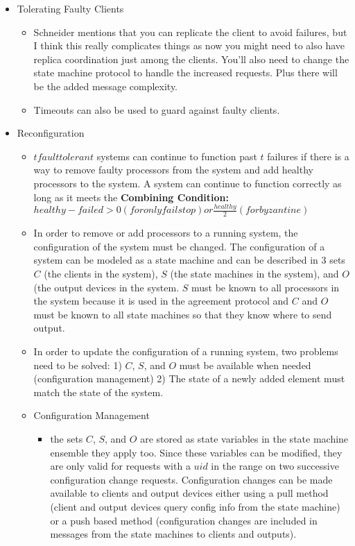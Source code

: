 \documentclass[a4paper]{article}
\begin{document}
\begin{itemize}
\item Tolerating Faulty Clients
\begin{itemize}
\item Schneider mentions that you can replicate the client to avoid failures, but I think this really complicates things as now you might need to also have replica coordination just among the clients. You'll also need to change the state machine protocol to handle the increased requests. Plus there will be the added message complexity.

\item Timeouts can also be used to guard against faulty clients.
\end{itemize}

\item Reconfiguration
\begin{itemize}
\item $t fault tolerant$ systems can continue to function past $t$ failures if there is a way to remove faulty processors from the system and add healthy processors to the system. A system can continue to function correctly as long as it meets the \textbf{Combining Condition:} $healthy - failed > 0 (for only fail stop) or \frac{healthy}{2} (for byzantine)$

\item In order to remove or add processors to a running system, the configuration of the system must be changed. The configuration of a system can be modeled as a state machine and can be described in 3 sets $C$ (the clients in the system), $S$ (the state machines in the system), and $O$ (the output devices in the system. $S$ must be known to all processors in the system because it is used in the agreement protocol and $C$ and $O$ must be known to all state machines so that they know where to send output.

\item In order to update the configuration of a running system, two problems need to be solved: 1) $C$, $S$, and $O$ must be available when needed (configuration management) 2) The state of a newly added element must match the state of the system.

\item Configuration Management
\begin{itemize}
\item the sets $C$, $S$, and $O$ are stored as state variables in the state machine ensemble they apply too. Since these variables can be modified, they are only valid for requests with a $uid$ in the range on two successive configuration change requests. Configuration changes can be made available to clients and output devices either using a pull method (client and output devices query config info from the state machine) or a push based method (configuration changes are included in messages from the state machines to clients and outputs). 


\end{itemize}
\end{itemize}
\end{itemize}
\end{document}
